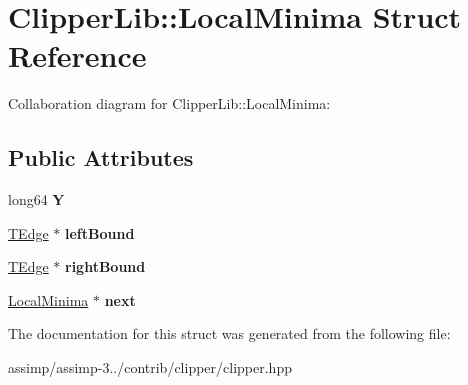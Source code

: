 \hypertarget{struct_clipper_lib_1_1_local_minima}{\section{Clipper\+Lib\+:\+:Local\+Minima Struct Reference}
\label{struct_clipper_lib_1_1_local_minima}
}


Collaboration diagram for Clipper\+Lib\+:\+:Local\+Minima\+:
\subsection*{Public Attributes}
\begin{DoxyCompactItemize}
\item 
\hypertarget{struct_clipper_lib_1_1_local_minima_aa742a79c0ce808e896f28db5d5250c48}{long64 {\bfseries Y}}\label{struct_clipper_lib_1_1_local_minima_aa742a79c0ce808e896f28db5d5250c48}

\item 
\hypertarget{struct_clipper_lib_1_1_local_minima_a9325e1ed560c430a60cc677cd7c4266e}{\hyperlink{struct_clipper_lib_1_1_t_edge}{T\+Edge} $\ast$ {\bfseries left\+Bound}}\label{struct_clipper_lib_1_1_local_minima_a9325e1ed560c430a60cc677cd7c4266e}

\item 
\hypertarget{struct_clipper_lib_1_1_local_minima_a458b140addcaf1d7bc4b2fe2d3ca81f4}{\hyperlink{struct_clipper_lib_1_1_t_edge}{T\+Edge} $\ast$ {\bfseries right\+Bound}}\label{struct_clipper_lib_1_1_local_minima_a458b140addcaf1d7bc4b2fe2d3ca81f4}

\item 
\hypertarget{struct_clipper_lib_1_1_local_minima_adc944a3044f14e476f4b4ea4d5403ceb}{\hyperlink{struct_clipper_lib_1_1_local_minima}{Local\+Minima} $\ast$ {\bfseries next}}\label{struct_clipper_lib_1_1_local_minima_adc944a3044f14e476f4b4ea4d5403ceb}

\end{DoxyCompactItemize}


The documentation for this struct was generated from the following file\+:\begin{DoxyCompactItemize}
\item 
assimp/assimp-\/3../contrib/clipper/clipper.\+hpp\end{DoxyCompactItemize}
